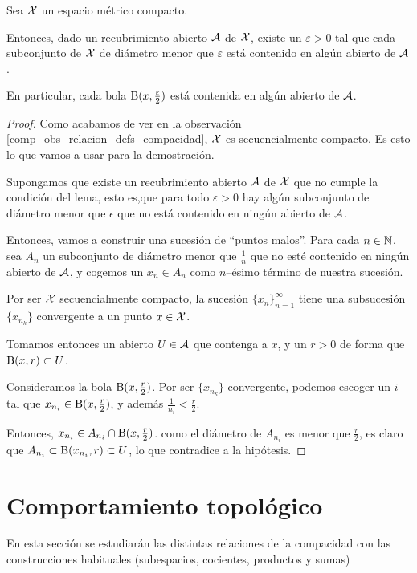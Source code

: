 \begin{lem}[Lebesgue]
	\label{comp_lem_lebesgue}
	Sea $\mathcal{X}$ un espacio métrico compacto.
	
	Entonces, dado un recubrimiento abierto $\mathcal{A}$ de $\mathcal{X}$, existe un $\varepsilon>0$ tal que cada subconjunto de $\mathcal{X}$ de diámetro menor que $\varepsilon$ está contenido en algún abierto de $\mathcal{A}$.
	
	En particular, cada bola $\operatorname{B}(x,\frac{\varepsilon}{2})$ está contenida en algún abierto de $\mathcal{A}$.
\end{lem}
\begin{proof}
	Como acabamos de ver en la observación \ref{comp_obs_relacion_defs_compacidad}, $\mathcal{X}$ es secuencialmente compacto. Es esto lo que vamos a usar para la demostración.
	
	Supongamos que existe un recubrimiento abierto $\mathcal{A}$ de $\mathcal{X}$ que no cumple la condición del lema, esto es,que para todo $\varepsilon > 0$ hay algún subconjunto de diámetro menor que $\epsilon$ que no está contenido en ningún abierto de $\mathcal{A}$.
	
	Entonces, vamos a construir una sucesión de ``puntos malos''. Para cada $n\in\mathbb{N}$, sea $A_n$ un subconjunto de diámetro menor que $\frac{1}{n}$ que no esté contenido en ningún abierto de $\mathcal{A}$, y cogemos un $x_n\in A_n$ como $n$--ésimo término de nuestra sucesión.
	
	Por ser $\mathcal{X}$ secuencialmente compacto, la sucesión $\{x_n\}_{n=1}^\infty$ tiene una subsucesión $\{x_{n_k}\}$ convergente a un punto $x\in\mathcal{X}$.
	
	Tomamos entonces un abierto $U\in\mathcal{A}$ que contenga a $x$, y un $r>0$ de forma que $\operatorname{B}(x,r)\subset U$.
	
	Consideramos la bola $\operatorname{B}(x,\frac{r}{2})$. Por ser $\{x_{n_k}\}$ convergente, podemos escoger un $i$ tal que $x_{n_i}\in\operatorname{B}(x,\frac{r}{2})$, y además  $\frac{1}{n_i}<\frac{r}{2}$.
	
	Entonces, $x_{n_i}\in A_{n_i}\cap\operatorname{B}(x,\frac{r}{2})$. como el diámetro de $A_{n_i}$ es menor que $\frac{r}{2}$, es claro que  $A_{n_i}\subset\operatorname{B}(x_{n_i},r)\subset U$, lo que contradice a la hipótesis.
\end{proof}
\section{Comportamiento topológico}
En esta sección se estudiarán las distintas relaciones de la compacidad con las construcciones habituales (subespacios, cocientes, productos y sumas)

